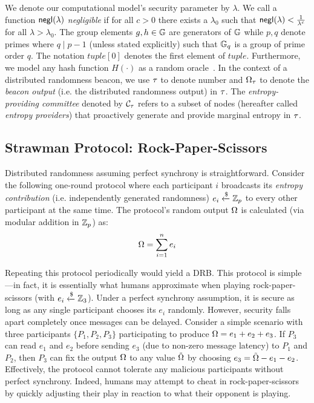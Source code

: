 We denote our computational model's security parameter by $\lambda$. We call a function $\mathsf{negl}(\lambda)$ \textit{negligible} if for all $c > 0$ there exists a $\lambda_0$ such that $\mathsf{negl}(\lambda) < \frac{1}{\lambda^c}$ for all $\lambda > \lambda_0$. The group elements $g, h \in \mathbb{G}$ are generators of $\mathbb{G}$ while $p, q$ denote primes where $q \mid p - 1$ (unless stated explicitly) such that $\mathbb{G}_q$ is a group of prime order $q$. The notation $tuple[0]$ denotes the first element of $tuple$. Furthermore, we model any hash function $H(\cdot)$ as a random oracle~\cite{bellare1993random}.
In the context of a distributed randomness beacon, we use $\tau$ to denote \epoch number and $\Omega_\tau$ to denote the \textit{beacon output} (i.e. the distributed randomness output) in \epoch $\tau$. The \textit{entropy-providing committee} denoted by $\mathcal{C}_\tau$ refers to a subset of nodes (hereafter called \textit{entropy providers}) that proactively generate and provide marginal entropy in \epoch $\tau$. %

\subsection{Strawman Protocol: Rock-Paper-Scissors}
Distributed randomness assuming perfect synchrony is straightforward. Consider the following one-round protocol where each participant $i$ broadcasts its \textit{entropy contribution} (i.e. independently generated randomness) $e_i \xleftarrow{\$} \mathbb{Z}_p$ to every other participant at the same time. The protocol's random output $\Omega$ is calculated (via modular addition in $\mathbb{Z}_p$) as:
\begin{equation}
\label{equation:addall}
\drboutput = \sum_{i = 1}^n e_i
\end{equation}

Repeating this protocol periodically would yield a DRB.
This protocol is simple---in fact, it is essentially what humans approximate when playing rock-paper-scissors (with $e_i \xleftarrow{\$} \mathbb{Z}_3$).
Under a perfect synchrony assumption, it is secure as long as any single participant chooses its $e_i$ randomly. However, security falls apart completely once messages can be delayed.
Consider a simple scenario with three participants $\{P_1, P_2, P_3\}$ participating to produce $\Omega = e_1 + e_2 + e_3$. If $P_3$ can read $e_1$ and $e_2$ before sending $e_3$ (due to non-zero message latency) to $P_1$ and $P_2$, then $P_3$ can fix the output $\Omega$ to any value $\tilde{\Omega}$ by choosing $e_3 = \tilde{\Omega} - e_1 - e_2$. Effectively, the protocol cannot tolerate any malicious participants without perfect synchrony.
Indeed, humans may attempt to cheat in rock-paper-scissors by quickly adjusting their play in reaction to what their opponent is playing.

